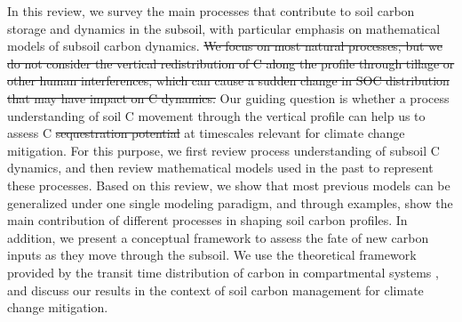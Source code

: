 \documentclass[11pt, oneside, a4paper]{article}   	%
\providecommand{\DIFaddtex}[1]{{\protect\color{blue}\uwave{#1}}} %
\providecommand{\DIFdeltex}[1]{{\protect\color{red}\sout{#1}}}                      %
\providecommand{\DIFaddbegin}{} %
\providecommand{\DIFaddend}{} %
\providecommand{\DIFdelbegin}{} %
\providecommand{\DIFdelend}{} %
\providecommand{\DIFadd}[1]{\texorpdfstring{\DIFaddtex{#1}}{#1}} %
\providecommand{\DIFdel}[1]{\texorpdfstring{\DIFdeltex{#1}}{}} %
\newcommand{\DIFscaledelfig}{0.5}
\newlength{\DIFdelgraphicswidth} %
\newlength{\DIFdelgraphicsheight} %
\newcommand{\DIFaddincludegraphics}[2][]{{\color{blue}\fbox{\DIFOincludegraphics[#1]{#2}}}} %
\newcommand{\DIFdelincludegraphics}[2][]{%
\sbox{\DIFdelgraphicsbox}{\DIFOincludegraphics[#1]{#2}}%
\settoboxwidth{\DIFdelgraphicswidth}{\DIFdelgraphicsbox} %
\settoboxtotalheight{\DIFdelgraphicsheight}{\DIFdelgraphicsbox} %
\scalebox{\DIFscaledelfig}{%
\parbox[b]{\DIFdelgraphicswidth}{\usebox{\DIFdelgraphicsbox}\\[-\baselineskip] \rule{\DIFdelgraphicswidth}{0em}}\llap{\resizebox{\DIFdelgraphicswidth}{\DIFdelgraphicsheight}{%
\setlength{\unitlength}{\DIFdelgraphicswidth}%
\begin{picture}(1,1)%
\thicklines\linethickness{2pt} %
{\color[rgb]{1,0,0}\put(0,0){\framebox(1,1){}}}%
{\color[rgb]{1,0,0}\put(0,0){\line( 1,1){1}}}%
{\color[rgb]{1,0,0}\put(0,1){\line(1,-1){1}}}%
\end{picture}%
}\hspace*{3pt}}} %
} %
\DeclareRobustCommand{\DIFaddbegin}{\DIFOaddbegin \let\includegraphics\DIFaddincludegraphics} %
\DeclareRobustCommand{\DIFaddend}{\DIFOaddend \let\includegraphics\DIFOincludegraphics} %
\DeclareRobustCommand{\DIFdelbegin}{\DIFOdelbegin \let\includegraphics\DIFdelincludegraphics} %
\DeclareRobustCommand{\DIFdelend}{\DIFOaddend \let\includegraphics\DIFOincludegraphics} %
\begin{document}
In this review, we survey the main processes that contribute to soil carbon storage and dynamics in the subsoil, with particular emphasis on mathematical models of subsoil carbon dynamics. 
\DIFdelbegin \DIFdel{We focus on most natural processes, but we do not consider the vertical redistribution of C along the profile through tillage or other human interferences, which can cause a sudden change in SOC distribution that may have impact on C dynamics.
}\DIFdelend %
Our guiding question is whether a process understanding of soil C movement through the vertical profile can help us to assess C \DIFdelbegin \DIFdel{sequestration potential }\DIFdelend \DIFaddbegin \DIFadd{storage and persistence }\DIFaddend at timescales relevant for climate change mitigation. 
For this purpose, we first review process understanding of subsoil C dynamics, and then review mathematical models used in the past to represent these processes. Based on this review, we show that most previous models can be generalized under one single modeling paradigm, and through examples, \DIFaddbegin \DIFadd{we }\DIFaddend show the main contribution of different processes in shaping soil carbon profiles. 
In addition, we present a conceptual framework to assess the fate of new carbon inputs as they move through the subsoil. We use the theoretical framework provided by the transit time distribution of carbon in compartmental systems \citep{Sierra2017GCB, Sierra2018GBC, Metzler2018MG}, and discuss our results in the context of  soil carbon management for climate change mitigation.
\end{document}
